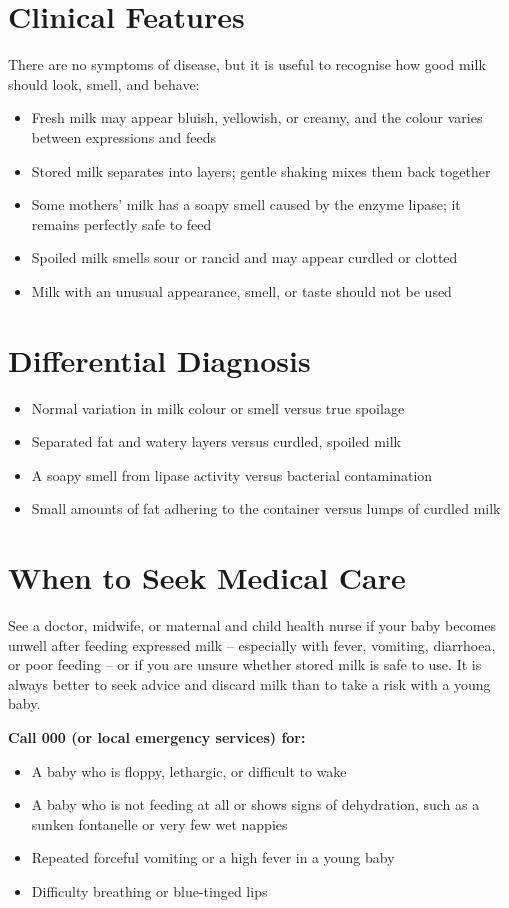 \section*{Clinical Features}
There are no symptoms of disease, but it is useful to recognise how good milk should look, smell, and behave:

\begin{itemize}
    \item Fresh milk may appear bluish, yellowish, or creamy, and the colour varies between expressions and feeds
    \item Stored milk separates into layers; gentle shaking mixes them back together
    \item Some mothers' milk has a soapy smell caused by the enzyme lipase; it remains perfectly safe to feed
    \item Spoiled milk smells sour or rancid and may appear curdled or clotted
    \item Milk with an unusual appearance, smell, or taste should not be used
\end{itemize}

\section*{Differential Diagnosis}
\begin{itemize}
    \item Normal variation in milk colour or smell versus true spoilage
    \item Separated fat and watery layers versus curdled, spoiled milk
    \item A soapy smell from lipase activity versus bacterial contamination
    \item Small amounts of fat adhering to the container versus lumps of curdled milk
\end{itemize}

\section*{When to Seek Medical Care}
See a doctor, midwife, or maternal and child health nurse if your baby becomes unwell after feeding expressed milk -- especially with fever, vomiting, diarrhoea, or poor feeding -- or if you are unsure whether stored milk is safe to use. It is always better to seek advice and discard milk than to take a risk with a young baby.

\textbf{Call 000 (or local emergency services) for:}
\begin{itemize}
    \item A baby who is floppy, lethargic, or difficult to wake
    \item A baby who is not feeding at all or shows signs of dehydration, such as a sunken fontanelle or very few wet nappies
    \item Repeated forceful vomiting or a high fever in a young baby
    \item Difficulty breathing or blue-tinged lips
\end{itemize}

